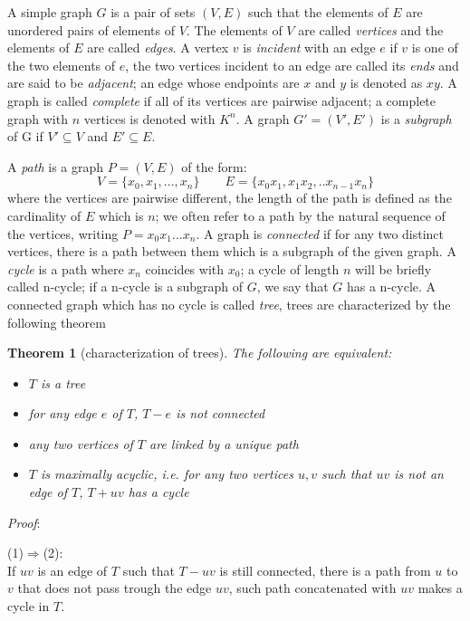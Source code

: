 \documentclass[a4paper,12pt,oneside]{book}
\newtheorem{theorem}{Theorem}[chapter]
\begin{document}
A simple graph $G$ is a pair of sets $(V,E)$ such that the elements of $E$ are unordered pairs of elements of $V$. The elements of $V$ are called \textit{vertices} and the elements of $E$ are called \textit{edges}. A vertex $v$ is \textit{incident} with an edge $e$ if $v$ is one of the two elements of $e$, the two vertices incident to an edge are called its \textit{ends} and are said to be \textit{adjacent}; an edge whose endpoints are $x$ and $y$ is denoted as $xy$. A graph is called  \textit{complete} if all of its vertices are pairwise adjacent; a complete graph with $n$ vertices is denoted with $K^n$.
A graph $G'=(V',E')$ is a \textit{subgraph} of G if $V' \subseteq V$ and $E' \subseteq E$.

A \textit{path} is a graph $P=(V,E)$ of the form:
$$ V=\{x_0,x_1, ..., x_n\} \qquad E=\{x_0 x_1, x_1x_2,.. x_{n-1}x_n\}$$ 
where the vertices are pairwise different, the length of the path is defined as the cardinality of $E$ which is $n$; we often refer to a path by the natural sequence of the vertices, writing $P=x_0x_1...x_n$. A graph is \textit{connected} if for any two distinct vertices, there is a path between them which is a subgraph of the given graph.  
A \textit{cycle} is a path where $x_n$ coincides with $x_0$; a cycle of length $n$ will be briefly called n-cycle; if a n-cycle is a subgraph of $G$, we say that $G$ has a n-cycle. 
 A connected graph which has no cycle is called \textit{tree}, trees are characterized by the following theorem 

\begin{theorem}[characterization of trees] The following are equivalent:
\begin{itemize}
\item[(1)] $T$ is a tree
\item[(2)] for any edge $e$ of $T$, $T-e$ is not connected   
\item[(3)] any two vertices of $T$ are linked by a unique path
\item[(4)] $T$ is maximally acyclic, i.e. for any two vertices $u,v$ such that $uv$ is not an edge of $T$, $T+uv$ has a cycle
\end{itemize}
\end{theorem}
\noindent\textit{Proof}: 

(1)$\Rightarrow$(2):\\
If $uv$ is an edge of $T$ such that $T-uv$ is still connected, there is a path from $u$ to $v$ that does not pass trough the edge $uv$, such path concatenated with $uv$ makes a cycle in $T$.
\end{document}
